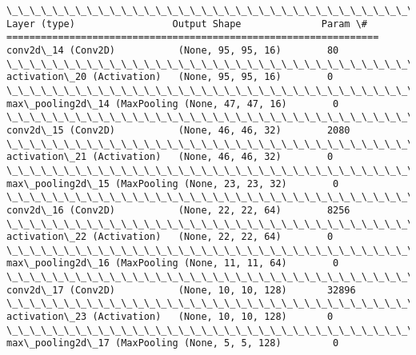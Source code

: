 \documentclass[11pt]{article}
\begin{document}
    \begin{Verbatim}[commandchars=\\\{\}]
\_\_\_\_\_\_\_\_\_\_\_\_\_\_\_\_\_\_\_\_\_\_\_\_\_\_\_\_\_\_\_\_\_\_\_\_\_\_\_\_\_\_\_\_\_\_\_\_\_\_\_\_\_\_\_\_\_\_\_\_\_\_\_\_\_
Layer (type)                 Output Shape              Param \#   
=================================================================
conv2d\_14 (Conv2D)           (None, 95, 95, 16)        80        
\_\_\_\_\_\_\_\_\_\_\_\_\_\_\_\_\_\_\_\_\_\_\_\_\_\_\_\_\_\_\_\_\_\_\_\_\_\_\_\_\_\_\_\_\_\_\_\_\_\_\_\_\_\_\_\_\_\_\_\_\_\_\_\_\_
activation\_20 (Activation)   (None, 95, 95, 16)        0         
\_\_\_\_\_\_\_\_\_\_\_\_\_\_\_\_\_\_\_\_\_\_\_\_\_\_\_\_\_\_\_\_\_\_\_\_\_\_\_\_\_\_\_\_\_\_\_\_\_\_\_\_\_\_\_\_\_\_\_\_\_\_\_\_\_
max\_pooling2d\_14 (MaxPooling (None, 47, 47, 16)        0         
\_\_\_\_\_\_\_\_\_\_\_\_\_\_\_\_\_\_\_\_\_\_\_\_\_\_\_\_\_\_\_\_\_\_\_\_\_\_\_\_\_\_\_\_\_\_\_\_\_\_\_\_\_\_\_\_\_\_\_\_\_\_\_\_\_
conv2d\_15 (Conv2D)           (None, 46, 46, 32)        2080      
\_\_\_\_\_\_\_\_\_\_\_\_\_\_\_\_\_\_\_\_\_\_\_\_\_\_\_\_\_\_\_\_\_\_\_\_\_\_\_\_\_\_\_\_\_\_\_\_\_\_\_\_\_\_\_\_\_\_\_\_\_\_\_\_\_
activation\_21 (Activation)   (None, 46, 46, 32)        0         
\_\_\_\_\_\_\_\_\_\_\_\_\_\_\_\_\_\_\_\_\_\_\_\_\_\_\_\_\_\_\_\_\_\_\_\_\_\_\_\_\_\_\_\_\_\_\_\_\_\_\_\_\_\_\_\_\_\_\_\_\_\_\_\_\_
max\_pooling2d\_15 (MaxPooling (None, 23, 23, 32)        0         
\_\_\_\_\_\_\_\_\_\_\_\_\_\_\_\_\_\_\_\_\_\_\_\_\_\_\_\_\_\_\_\_\_\_\_\_\_\_\_\_\_\_\_\_\_\_\_\_\_\_\_\_\_\_\_\_\_\_\_\_\_\_\_\_\_
conv2d\_16 (Conv2D)           (None, 22, 22, 64)        8256      
\_\_\_\_\_\_\_\_\_\_\_\_\_\_\_\_\_\_\_\_\_\_\_\_\_\_\_\_\_\_\_\_\_\_\_\_\_\_\_\_\_\_\_\_\_\_\_\_\_\_\_\_\_\_\_\_\_\_\_\_\_\_\_\_\_
activation\_22 (Activation)   (None, 22, 22, 64)        0         
\_\_\_\_\_\_\_\_\_\_\_\_\_\_\_\_\_\_\_\_\_\_\_\_\_\_\_\_\_\_\_\_\_\_\_\_\_\_\_\_\_\_\_\_\_\_\_\_\_\_\_\_\_\_\_\_\_\_\_\_\_\_\_\_\_
max\_pooling2d\_16 (MaxPooling (None, 11, 11, 64)        0         
\_\_\_\_\_\_\_\_\_\_\_\_\_\_\_\_\_\_\_\_\_\_\_\_\_\_\_\_\_\_\_\_\_\_\_\_\_\_\_\_\_\_\_\_\_\_\_\_\_\_\_\_\_\_\_\_\_\_\_\_\_\_\_\_\_
conv2d\_17 (Conv2D)           (None, 10, 10, 128)       32896     
\_\_\_\_\_\_\_\_\_\_\_\_\_\_\_\_\_\_\_\_\_\_\_\_\_\_\_\_\_\_\_\_\_\_\_\_\_\_\_\_\_\_\_\_\_\_\_\_\_\_\_\_\_\_\_\_\_\_\_\_\_\_\_\_\_
activation\_23 (Activation)   (None, 10, 10, 128)       0         
\_\_\_\_\_\_\_\_\_\_\_\_\_\_\_\_\_\_\_\_\_\_\_\_\_\_\_\_\_\_\_\_\_\_\_\_\_\_\_\_\_\_\_\_\_\_\_\_\_\_\_\_\_\_\_\_\_\_\_\_\_\_\_\_\_
max\_pooling2d\_17 (MaxPooling (None, 5, 5, 128)         0         

\end{Verbatim}
\end{document}

